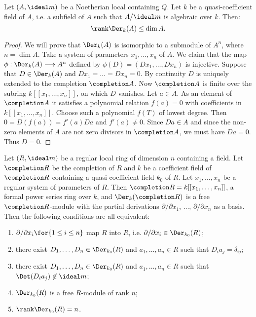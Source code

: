 \documentclass[../main]{subfiles}
\begin{document}
\begin{partheorem}\label{thm:098}
Let $(A, \ideal m)$ be a Noetherian local  containing $Q$. Let $k$ be a quasi-coefficient field of $A$, i.e. a subfield of $A$ such that $A/\ideal m$ is algebraic over $k$. Then: 
\[
\rank \Der_k(A) \le \dim A.
\]
\end{partheorem}

\begin{proof}
We will prove that $\Der_k(A)$ is isomorphic to a submodule of $A^n$, where $n = \dim A$. Take a system of parameters $x_1, \ldots, x_n$ of $A$. We claim that the map $\phi : \Der_k(A) \longrightarrow A^n$ defined by $\phi(D) = (D x_1, \ldots, D x_n)$ is injective. Suppose that $D \in \Der_k(A)$ and $D x_1 = \ldots = D x_n = 0$. By continuity $D$ is uniquely extended to the completion $\completion A$. Now $\completion A$ is finite over the subring $k[[x_1, \ldots, x_n]]$, on which $D$ vanishes. Let $a \in A$. As an element of $\completion A$ it satisfies a polynomial relation $f(a) = 0$ with coefficients in $k[[x_1, \ldots, x_n]]$. Choose such a polynomial $f(T)$ of lowest degree. Then $0 = D(f(a)) = f'(a) Da$ and $f'(a) \ne 0$. Since $D a \in A$ and since the non-zero elements of $A$ are not zero divisors in $\completion A$, we must have $D a = 0$. Thus $D = 0$. 
\end{proof}

\begin{theorem}\label{thm:099}
Let $(R, \ideal m)$ be a regular local ring of dimension $n$ containing a field. Let $\completion R$ be the completion of $R$ and $k$ be a coefficient field of $\completion R$ containing a quasi-coefficient field $k_0$ of $R$. Let $x_1, \ldots, x_n$ be a regular system of parameters of $R$. Then $\completion R = k[[x_1, \ldots, x_n]]$, a formal power series ring over $k$, and $\Der_k(\completion R)$ is a free $\completion R$-module with the partial derivations $\partial/\partial x_1$, $\ldots$, $\partial/\partial x_n$ as a basis. Then the following conditions are all equivalent: 

\begin{enumerate}[label=(\arabic*)]
    \item $\partial/\partial x_i\for{1 \le i \le n}$ map $R$ into $R$, i.e. $\partial/\partial x_i \in \Der_{k_0}(R)$;
    \item there exist $D_1, \ldots, D_n \in \Der_{k_0}(R)$ and $a_1, \ldots, a_n \in R$ such that $D_i a_j = \delta_{ij}$;
    \item there exist $D_1, \ldots, D_n \in \Der_{k_0}(R)$ and $a_1, \ldots, a_n \in R$ such that\linebreak$\Det(D_i a_j) \not \in \ideal m$;
    \item $\Der_{k_0}(R)$ is a free $R$-module of rank $n$;
    \item $\rank \Der_{k_0}(R) = n$.
\end{enumerate}
\end{theorem}
\end{document}
